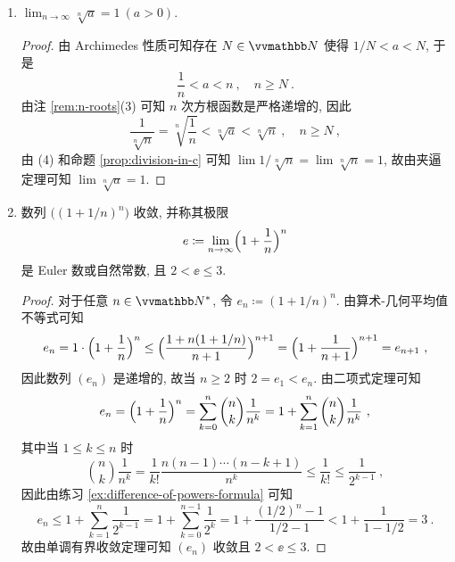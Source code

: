 \begin{example}
\begin{enumerate}
\begin{proof}
\[                \frac{n}{(1 + \varepsilon)^n} < 1\ ,\quad n \geq N\ ,
            \]
            因此
            \[
                1 \leq n < (1 + \varepsilon)^n\ ,\quad n \geq \max\{1, N\}\ .
            \]
            由注 \ref{rem:n-roots}(3) 可知 \(n\) 次方根函数是严格递增的, 于是
            \[
                1 \leq \sqrt[n]{n} < 1 + \varepsilon\ ,\quad n \geq \max\{1, N\}\ ,
            \]
            即 \(|\sqrt[n]{n} - 1| < \varepsilon\), 故 \(\lim \sqrt[n]{n} = 1\).
        \end{proof}
        \item \(\displaystyle \lim_{n \to \infty} \sqrt[n]{a} = 1\ (a > 0)\).
        \begin{proof}
            由 Archimedes 性质可知存在 \(N \in \N\) 使得 \(1 / N < a < N\), 于是
            \[
                \frac{1}{n} < a < n\ ,\quad n \geq N\ .
            \]
            由注 \ref{rem:n-roots}(3) 可知 \(n\) 次方根函数是严格递增的, 因此
            \[
                \frac{1}{\sqrt[n]{n}} = \sqrt[n]{\frac{1}{n}} < \sqrt[n]{a} < \sqrt[n]{n}\ ,\quad n \geq N\ ,
            \]
            由 (4) 和命题 \ref{prop:division-in-c} 可知 \(\lim 1 / \sqrt[n]{n} = \lim \sqrt[n]{n} = 1\), 故由夹逼定理可知 \(\lim \sqrt[n]{a} = 1\).
        \end{proof}
        \item 数列 \(\bigl((1 + 1 / n)^n\bigr)\) 收敛, 并称其极限
        \[
            e \coloneqq \lim_{n \to \infty} \Bigl(1 + \frac{1}{n}\Bigr)^n
        \]
        是 Euler 数或自然常数, 且 \(2 < \ee \leq 3\).
        \begin{proof}
            对于任意 \(n \in \N^\ast\), 令 \(e_n \coloneqq (1 + 1 / n)^n\). 由算术-几何平均值不等式可知
            \[
                e_n = 1 \cdot \Bigl(1 + \frac{1}{n}\Bigr)^n \leq \Bigl(\frac{1 + n (1 + 1 / n)}{n + 1}\Bigr)^{n + 1} = \Bigl(1 + \frac{1}{n + 1}\Bigr)^{n + 1} = e_{n + 1}\ ,
            \]
            因此数列 \((e_n)\) 是递增的, 故当 \(n \geq 2\) 时 \(2 = e_1 < e_n\). 由二项式定理可知
            \[
                e_n = \Bigl(1 + \frac{1}{n}\Bigr)^n = \sum_{k = 0}^n \binom{n}{k} \frac{1}{n^k} = 1 + \sum_{k = 1}^n \binom{n}{k} \frac{1}{n^k}\ ,
            \]
            其中当 \(1 \leq k \leq n\) 时
            \[
                \binom{n}{k} \frac{1}{n^k} = \frac{1}{k!} \frac{n (n - 1) \cdots (n - k + 1)}{n^k} \leq \frac{1}{k!} \leq \frac{1}{2^{k - 1}}\ ,
            \]
            因此由练习 \ref{ex:difference-of-powers-formula} 可知
            \[
                e_n \leq 1 + \sum_{k = 1}^n \frac{1}{2^{k - 1}} = 1 + \sum_{k = 0}^{n - 1} \frac{1}{2^k} = 1 + \frac{(1 / 2)^n - 1}{1 / 2 - 1} < 1 + \frac{1}{1 - 1 / 2} = 3\ .
            \]
            故由单调有界收敛定理可知 \((e_n)\) 收敛且 \(2 < \ee \leq 3\).
        \end{proof}
    \end{enumerate}


\end{example}
